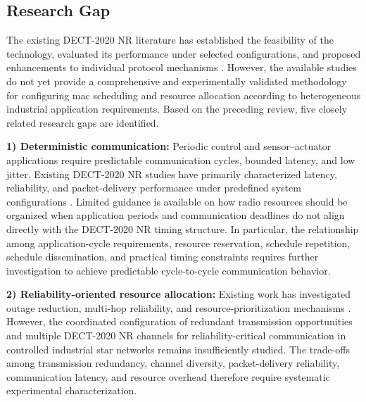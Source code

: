 \documentclass[12pt,a4paper]{article}
\begin{document}

\subsection{Research Gap}
\label{subsec:research_gap}

The existing DECT-2020 NR literature has established the feasibility of the technology, evaluated its performance under selected configurations, and proposed enhancements to individual protocol mechanisms
\cite{dhanwaniAssessmentCandidateTechnology2020,
anttonenEnablingMassiveMachine2021a,
pennerURLLCPerformanceEvaluation2021,
wassmannPerformanceDECT2020NR2024,
ahmadMACProtocolReducing2024,
nihtilaEnergyConsumptionDECT20202022}.
However, the available studies do not yet provide a comprehensive and experimentally validated methodology for configuring \gls{mac} scheduling and resource allocation according to heterogeneous industrial application requirements. Based on the preceding review, five closely related research gaps are identified.

\textbf{1) Deterministic communication:}
Periodic control and sensor--actuator applications require predictable communication cycles, bounded latency, and low jitter. Existing DECT-2020 NR studies have primarily characterized latency, reliability, and packet-delivery performance under predefined system configurations
\cite{pennerURLLCPerformanceEvaluation2021,
smidaETSIDECT2020Component2023,
llagunoPhysicalLayerPerformance2024,
bandaraExperimentalValidationAnalysis2025}.
Limited guidance is available on how radio resources should be organized when application periods and communication deadlines do not align directly with the DECT-2020 NR timing structure. In particular, the relationship among application-cycle requirements, resource reservation, schedule repetition, schedule dissemination, and practical timing constraints requires further investigation to achieve predictable cycle-to-cycle communication behavior.

\textbf{2) Reliability-oriented resource allocation:}
Existing work has investigated outage reduction, multi-hop reliability, and resource-prioritization mechanisms
\cite{ahmadMACProtocolReducing2024,
ahmadMACLayerProtocolUltraReliable2025,
binasifIRSAssistedDECT2020NR2025}.
However, the coordinated configuration of redundant transmission opportunities and multiple DECT-2020 NR channels for reliability-critical communication in controlled industrial star networks remains insufficiently studied. The trade-offs among transmission redundancy, channel diversity, packet-delivery reliability, communication latency, and resource overhead therefore require systematic experimental characterization.
\end{document}
